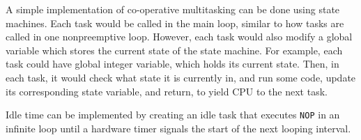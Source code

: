 A simple implementation of co-operative multitasking can be done using state
machines. Each task would be called in the main loop, similar to how tasks are
called in one nonpreemptive loop. However, each task would also modify a global
variable which stores the current state of the state machine. 
For example, each task could have global integer variable, which holds its
current state. Then, in each task, it would check what state it is currently in,
and run some code, update its corresponding state variable, and return, to yield
CPU to the next task.


Idle time can be implemented by creating an idle task that executes \texttt{NOP}
in an infinite loop until a hardware timer signals the start of the next looping
interval. 
